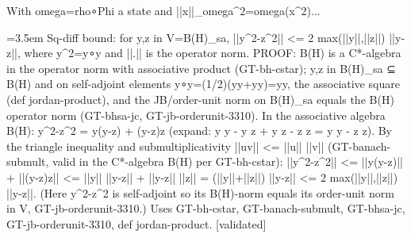 \documentclass{article}
\newcommand{\step}[1]{\par\noindent\hangindent=3.5em\hangafter=1%
  \makebox[3.5em][l]{\textbf{#1.}}}
\newcommand{\steptag}[1]{\hfill{\small\textsf{[#1]}}}
\begin{document}
\begin{proofbox}{With omega=rho∘Phi a state and ||x||\_omega\textasciicircum{}2=omega(x\textasciicircum{}2)...}
\step{1.2.1} Sq-diff bound: for y,z in V=B(H)\_sa, ||y\textasciicircum{}2-z\textasciicircum{}2|| <= 2 max(||y||,||z||) ||y-z||, where y\textasciicircum{}2=y∘y and ||.|| is the operator norm. PROOF: B(H) is a C*-algebra in the operator norm with associative product (GT-bh-cstar); y,z in B(H)\_sa ⊆ B(H) and on self-adjoint elements y∘y=(1/2)(yy+yy)=yy, the associative square (def jordan-product), and the JB/order-unit norm on B(H)\_sa equals the B(H) operator norm (GT-bhsa-jc, GT-jb-orderunit-3310). In the associative algebra B(H): y\textasciicircum{}2-z\textasciicircum{}2 = y(y-z) + (y-z)z (expand: y y - y z + y z - z z = y y - z z). By the triangle inequality and submultiplicativity ||uv|| <= ||u|| ||v|| (GT-banach-submult, valid in the C*-algebra B(H) per GT-bh-cstar): ||y\textasciicircum{}2-z\textasciicircum{}2|| <= ||y(y-z)|| + ||(y-z)z|| <= ||y|| ||y-z|| + ||y-z|| ||z|| = (||y||+||z||) ||y-z|| <= 2 max(||y||,||z||) ||y-z||. (Here y\textasciicircum{}2-z\textasciicircum{}2 is self-adjoint so its B(H)-norm equals its order-unit norm in V, GT-jb-orderunit-3310.) Uses GT-bh-cstar, GT-banach-submult, GT-bhsa-jc, GT-jb-orderunit-3310, def jordan-product. \steptag{validated} \\[4pt]

\end{proofbox}
\end{document}
